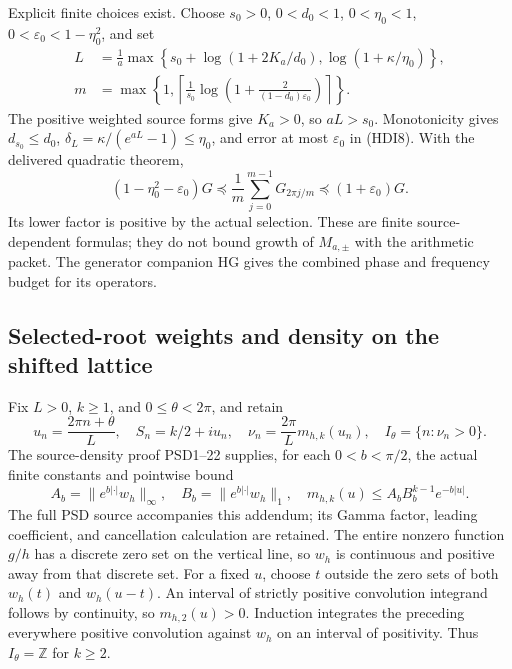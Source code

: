 \documentclass{article}
\begin{document}
Explicit finite choices exist. Choose \(s_0>0\), \(0<d_0<1\),
\(0<\eta_0<1\), \(0<\varepsilon_0<1-\eta_0^2\), and set
\[
 \begin{split}
 L&=\frac1a\max\left\{s_0+\log(1+2K_a/d_0),
                         \log(1+\kappa/\eta_0)\right\},\\
 m&=\max\left\{1,\left\lceil\frac1{s_0}
 \log\left(1+\frac{2}{(1-d_0)\varepsilon_0}\right)\right\rceil\right\}.
 \end{split}
 \tag{HDI9}
\]
The positive weighted source forms give \(K_a>0\), so \(aL>s_0\).
Monotonicity gives \(d_{s_0}\le d_0\),
\(\delta_L=\kappa/(e^{aL}-1)\le\eta_0\), and error at most
\(\varepsilon_0\) in (HDI8). With the delivered quadratic theorem,
\[
 (1-\eta_0^2-\varepsilon_0)G
 \preceq \frac1m\sum_{j=0}^{m-1}G_{2\pi j/m}
 \preceq(1+\varepsilon_0)G.
 \tag{HDI10}
\]
Its lower factor is positive by the actual selection. These are
finite source-dependent formulas; they do not bound growth of
\(M_{a,\pm}\) with the arithmetic packet. The generator companion
HG gives the combined phase and frequency budget for its operators.

\subsection{Selected-root weights and density on the shifted lattice}
Fix \(L>0\), \(k\ge1\), and \(0\le\theta<2\pi\), and retain
\[
 u_n=\frac{2\pi n+\theta}{L},\quad S_n=k/2+iu_n,\quad
 \nu_n=\frac{2\pi}{L}m_{h,k}(u_n),\quad
 I_\theta=\{n:\nu_n>0\}.
 \tag{HDI11}
\]
The source-density proof PSD1--22 supplies, for each
\(0<b<\pi/2\), the actual finite constants and pointwise bound
\[
 A_b=\|e^{b|\cdot|}w_h\|_\infty,\quad
 B_b=\|e^{b|\cdot|}w_h\|_1,\quad
 m_{h,k}(u)\le A_bB_b^{k-1}e^{-b|u|}.
 \tag{HDI12}
\]
The full PSD source accompanies this addendum; its Gamma factor,
leading coefficient, and cancellation calculation are retained.
The entire nonzero function \(g/h\) has a discrete zero set on
the vertical line, so \(w_h\) is continuous and positive away
from that discrete set. For a fixed \(u\), choose \(t\) outside
the zero sets of both \(w_h(t)\) and \(w_h(u-t)\). An interval
of strictly positive convolution integrand follows by continuity,
so \(m_{h,2}(u)>0\). Induction integrates the preceding everywhere
positive convolution against \(w_h\) on an interval of positivity.
Thus \(I_\theta=\mathbb Z\) for \(k\ge2\).
\end{document}
